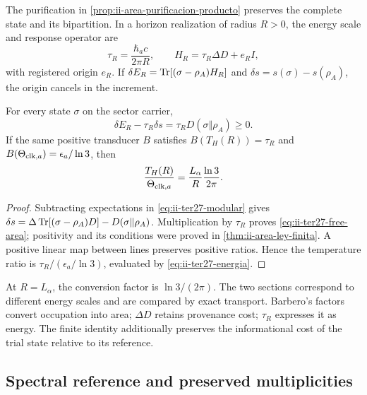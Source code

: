 The purification in \ref{prop:ii-area-purificacion-producto} preserves the
complete state and its bipartition. In a horizon realization of radius
$R>0$, the energy scale and response operator are
\begin{equation}
 \tau_R=\frac{\hbar_ac}{2\pi R},\qquad
 H_R=\tau_R\Delta D+e_RI,
 \label{eq:ii-ter27-response}
\end{equation}
with registered origin $e_R$. If
$\delta E_R=\operatorname{Tr}[(\sigma-\rho_A)H_R]$ and
$\delta s=s(\sigma)-s(\rho_A)$, the origin cancels in the increment.

\begin{theorem}
\label{thm:ii-ter27-horizon}
For every state $\sigma$ on the sector carrier,
\begin{equation}
 \delta E_R-\tau_R\delta s
 =\tau_R D(\sigma\Vert\rho_A)\ge0.
 \label{eq:ii-ter27-free-area}
\end{equation}
If the same positive transducer $B$ satisfies
$B(T_H(R))=\tau_R$ and
$B(\Theta_{{\rm clk},a})=\epsilon_a/\ln3$, then
\begin{equation}
 \frac{T_H(R)}{\Theta_{{\rm clk},a}}
 =\frac{L_\alpha}{R}\frac{\ln3}{2\pi}.
 \label{eq:ii-ter27-clock-horizon}
\end{equation}
\end{theorem}
\begin{proof}
Subtracting expectations in \eqref{eq:ii-ter27-modular} gives
$\delta s=\Delta\operatorname{Tr}[(\sigma-\rho_A)D]-D(\sigma\Vert\rho_A)$.
Multiplication by $\tau_R$ proves \eqref{eq:ii-ter27-free-area}; positivity
and its conditions were proved in \ref{thm:ii-area-ley-finita}.
A positive linear map between lines preserves positive ratios. Hence the
temperature ratio is $\tau_R/(\epsilon_a/\ln3)$, evaluated by
\eqref{eq:ii-ter27-energia}.
\end{proof}

At $R=L_\alpha$, the conversion factor is $\ln3/(2\pi)$.
The two sections correspond to different energy scales and are compared
by exact transport. Barbero's factors convert occupation into area;
$\Delta D$ retains provenance cost; $\tau_R$ expresses it as energy.
The finite identity additionally preserves the informational cost of the
trial state relative to its reference.

\subsection{Spectral reference and preserved multiplicities}
\label{subsec:ii-ter27-reference}

